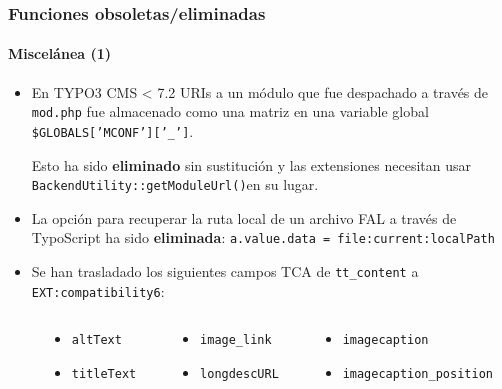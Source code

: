 \begin{frame}[fragile]
	\frametitle{Funciones obsoletas/eliminadas}
	\framesubtitle{Miscelánea (1)}

	\begin{itemize}

		\item En TYPO3 CMS < 7.2 URIs a un módulo que fue despachado a través de 
			\texttt{mod.php} fue almacenado como una matriz en una variable global 
			\small\texttt{\$GLOBALS['MCONF']['\_']}\normalsize.

			Esto ha sido \textbf{eliminado} sin sustitución y las extensiones necesitan usar
			\texttt{BackendUtility::getModuleUrl()}\normalsize\space en su lugar.

		\item La opción para recuperar la ruta local de un archivo FAL a través de TypoScript 
			ha sido \textbf{eliminada}:\newline
			\texttt{a.value.data = file:current:localPath}

		\item Se han trasladado los siguientes campos TCA de \texttt{tt\_content} a
			\texttt{EXT:compatibility6}:

	\end{itemize}

	\vspace{-0.2cm}

	\begin{columns}[T]
		\begin{column}{.06\textwidth}
		\end{column}
		\begin{column}{.24\textwidth}
			\smaller
			\begin{itemize}
				\item \texttt{altText}
				\item \texttt{titleText}
			\end{itemize}
			\normalsize
		\end{column}
		\begin{column}{.24\textwidth}
			\smaller
			\begin{itemize}
				\item \texttt{image\_link}
				\item \texttt{longdescURL}
			\end{itemize}
			\normalsize
		\end{column}
		\begin{column}{.46\textwidth}
			\smaller
			\begin{itemize}
				\item \texttt{imagecaption}
				\item \texttt{imagecaption\_position}
			\end{itemize}
			\normalsize
		\end{column}
	\end{columns}

\end{frame}


